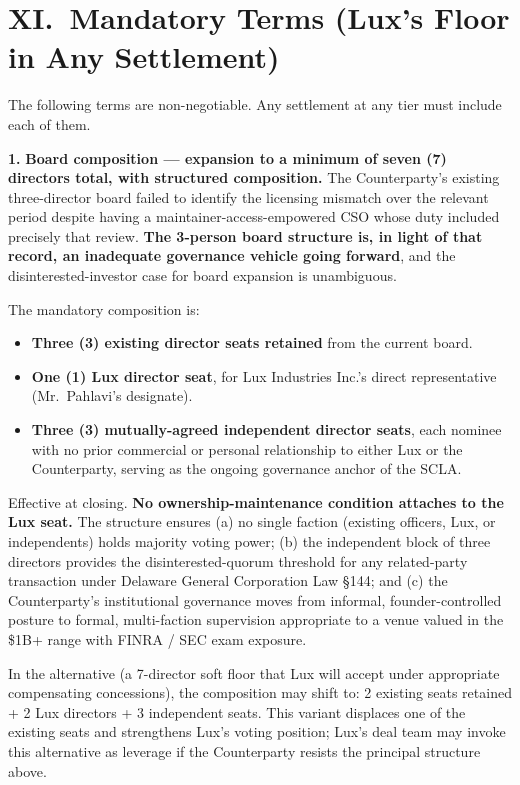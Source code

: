 \documentclass[11pt,letterpaper]{article}
\begin{document}
\section*{XI.\ Mandatory Terms (Lux's Floor in Any Settlement)}

The following terms are non-negotiable. Any settlement at any tier
must include each of them.

\textbf{1.} \textbf{Board composition --- expansion to a minimum of
seven (7) directors total, with structured composition.} The
Counterparty's existing three-director board failed to identify the
licensing mismatch over the relevant period despite having a
maintainer-access-empowered CSO whose duty included precisely that
review. \textbf{The 3-person board structure is, in light of that
record, an inadequate governance vehicle going forward}, and the
disinterested-investor case for board expansion is unambiguous.

The mandatory composition is:

\begin{itemize}[leftmargin=2em,itemsep=0.1em]
\item \textbf{Three (3) existing director seats retained} from the
current board.
\item \textbf{One (1) Lux director seat}, for Lux Industries Inc.'s
direct representative (Mr.\ Pahlavi's designate).
\item \textbf{Three (3) mutually-agreed independent director seats},
each nominee with no prior commercial or personal relationship to
either Lux or the Counterparty, serving as the ongoing governance
anchor of the SCLA.
\end{itemize}

Effective at closing. \textbf{No ownership-maintenance condition
attaches to the Lux seat.} The structure ensures (a) no single
faction (existing officers, Lux, or independents) holds majority
voting power; (b) the independent block of three directors provides
the disinterested-quorum threshold for any related-party transaction
under Delaware General Corporation Law \S 144; and (c) the
Counterparty's institutional governance moves from informal,
founder-controlled posture to formal, multi-faction supervision
appropriate to a venue valued in the \$1B+ range with FINRA / SEC
exam exposure.

In the alternative (a 7-director soft floor that Lux will accept
under appropriate compensating concessions), the composition may
shift to: 2 existing seats retained + 2 Lux directors + 3 independent
seats. This variant displaces one of the existing seats and
strengthens Lux's voting position; Lux's deal team may invoke this
alternative as leverage if the Counterparty resists the principal
structure above.
\end{document}

